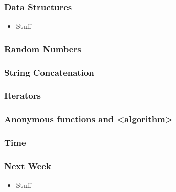 \documentclass[glossy]{beamer}
\begin{document}
\begin{frame}[fragile=singleslide]
  \frametitle{Data Structures}
  \begin{itemize}
    \item Stuff
  \end{itemize}
\end{frame}

\begin{frame}[fragile=singleslide]
  \frametitle{Random Numbers}
  \begin{cppcode}
  \end{cppcode}
\end{frame}

\begin{frame}[fragile=singleslide]
  \frametitle{String Concatenation}
  \begin{cppcode}
  \end{cppcode}
\end{frame}

\begin{frame}[fragile=singleslide]
  \frametitle{Iterators}
  \begin{cppcode}
  \end{cppcode}
\end{frame}

\begin{frame}[fragile=singleslide]
  \frametitle{Anonymous functions and <algorithm>}
  \begin{cppcode}
  \end{cppcode}
\end{frame}

\begin{frame}[fragile=singleslide]
  \frametitle{Time}
  \begin{cppcode}
  \end{cppcode}
\end{frame}

\begin{frame}[fragile=singleslide]
  \frametitle{Next Week}
  \begin{itemize}
    \item Stuff
  \end{itemize}
\end{frame}
\end{document}
